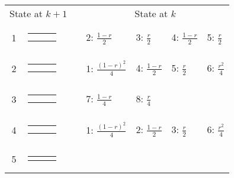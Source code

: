 \begin{center}
\begin{tabular}{cccllll} \hline
\multicolumn{2}{c}{State at $k+1$} & &
\multicolumn{4}{c}{State at $k$} \\
\cline{1-2} \cline{4-7}
1 &
{\renewcommand{\arraystretch}{0.3}
\renewcommand{\tabcolsep}{0.5mm}
\parbox[b][3mm][c]{12mm}{
\begin{tabular}{|p{2mm}|p{2mm}||p{2mm}|} \hline
$\bullet$ & $\circ  $ &           \\
$\bullet$ & $\circ  $ &           \\ \hline
\end{tabular}}}
&
& 2: $\frac{1-r}{2}$
& 3: $\frac{r}{2}$
& 4: $\frac{1-r}{2}$
& 5: $\frac{r}{2}$
\\
2 &
{\renewcommand{\arraystretch}{0.3}
\renewcommand{\tabcolsep}{0.5mm}
\parbox[b][3mm][c]{12mm}{
\begin{tabular}{|p{2mm}|p{2mm}||p{2mm}|} \hline
$\bullet$ &           & $\circ  $ \\
$\bullet$ &           & $\circ  $ \\ \hline
\end{tabular}}}
&
& 1: $\frac{(1-r)^2}{4}$
& 4: $\frac{1-r}{2}$
& 5: $\frac{r}{2}$
& 6: $\frac{r^2}{4}$
\\
3 &
{\renewcommand{\arraystretch}{0.3}
\renewcommand{\tabcolsep}{0.5mm}
\parbox[b][3mm][c]{12mm}{
\begin{tabular}{|p{2mm}|p{2mm}||p{2mm}|} \hline
$\bullet$ &           & $\circ  $ \\
          & $\bullet$ & $\circ  $ \\ \hline
\end{tabular}}}
&
& 7: $\frac{1-r}{4}$
& 8: $\frac{r}{4}$
& & \\
4 &
{\renewcommand{\arraystretch}{0.3}
\renewcommand{\tabcolsep}{0.5mm}
\parbox[b][3mm][c]{12mm}{
\begin{tabular}{|p{2mm}|p{2mm}||p{2mm}|} \hline
$\circ  $ &           & $\bullet$ \\
$\circ  $ &           & $\bullet$ \\ \hline
\end{tabular}}}
&
& 1: $\frac{(1-r)^2}{4}$
& 2: $\frac{1-r}{2}$
& 3: $\frac{r}{2}$
& 6: $\frac{r^2}{4}$
\\
5 &
{\renewcommand{\arraystretch}{0.3}
\renewcommand{\tabcolsep}{0.5mm}
\parbox[b][3mm][c]{12mm}{
\begin{tabular}{|p{2mm}|p{2mm}||p{2mm}|} \hline
$\circ  $ &           & $\bullet$ \\

\end{tabular}}}
\end{tabular}
\end{center}
